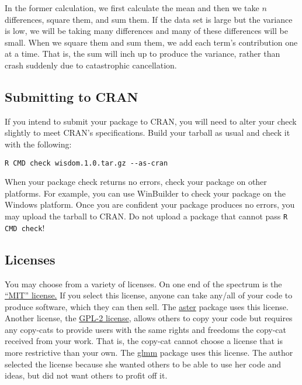 \documentclass{article}
\begin{document}
In the former calculation, we first calculate the mean and then we take $n$ differences, square them, and sum them. If the data set is large but the variance is low, we will be taking many differences and many of these differences will be small. When we square them and sum them, we add each term's contribution one at a time. That is, the sum will inch up to produce the variance, rather than crash suddenly due to catastrophic cancellation.

\subsection{Submitting to CRAN} If you intend to submit your package to CRAN, you will need to alter your check slightly to meet CRAN's specifications. Build your tarball as usual and check it with the following:
\begin{verbatim}
R CMD check wisdom.1.0.tar.gz --as-cran
\end{verbatim}
When your package check returns no errors, check your package on other platforms. For example, you can use WinBuilder to check your package on the Windows platform. Once you are confident your package produces no errors, you may upload the tarball to CRAN. Do not upload a package that cannot pass \texttt{R CMD check}!


\subsection{Licenses}\label{sec:lic}
You may choose from a variety of licenses. On one end of the spectrum is the \href{https://cran.r-project.org/web/licenses/MIT}{``MIT'' license.} If you select this license, anyone can take any/all of your code to produce software, which they can then sell. The \href{https://cran.r-project.org/web/packages/aster/index.html}{aster} package uses this license. \\

Another license, the \href{https://cran.r-project.org/web/licenses/GPL-2}{GPL-2 license}, allows others to copy your code but requires any copy-cats to provide users with the same rights and freedoms the copy-cat received from your  work. That  is, the copy-cat cannot choose a license that is more restrictive than your own. The \href{https://cran.r-project.org/web/packages/glmm/index.html}{glmm} package uses this license. The author selected the license because she wanted others to be able to use her code and ideas, but did not want others to profit off it.  
\end{document}
